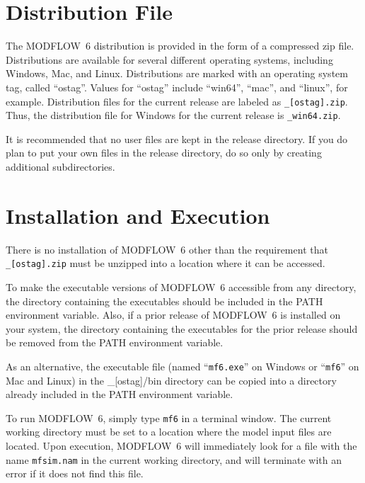 \documentclass[11pt,twoside,twocolumn]{usgsreport}
\begin{document}
\section{Distribution File}
The MODFLOW~6 distribution is provided in the form of a compressed zip file.  Distributions are available for several different operating systems, including Windows, Mac, and Linux.  Distributions are marked with an operating system tag, called ``ostag''.  Values for ``ostag'' include ``win64'', ``mac'', and ``linux'', for example.  Distribution files for the current release are labeled as \texttt{\modflowversion\_[ostag].zip}.  Thus, the distribution file for Windows for the current release is \texttt{\modflowversion\_win64.zip}.

It is recommended that no user files are kept in the release directory.  If you do plan to put your own files in the release directory, do so only by creating additional subdirectories.

\section{Installation and Execution}
There is no installation of MODFLOW~6 other than the requirement that \texttt{\modflowversion\_[ostag].zip} must be unzipped into a location where it can be accessed.  

To make the executable versions of MODFLOW~6 accessible from any directory, the directory containing the executables should be included in the PATH environment variable.  Also, if a prior release of MODFLOW~6 is installed on your system, the directory containing the executables for the prior release should be removed from the PATH environment variable.

As an alternative, the executable file (named ``\texttt{mf6.exe}'' on Windows or ``\texttt{mf6}'' on Mac and Linux) in the \modflowversion\_[ostag]/bin directory can be copied into a directory already included in the PATH environment variable.

To run MODFLOW~6, simply type \texttt{mf6} in a terminal window.  The current working directory must be set to a location where the model input files are located.  Upon execution, MODFLOW~6 will immediately look for a file with the name \texttt{mfsim.nam} in the current working directory, and will terminate with an error if it does not find this file.

\end{document}
